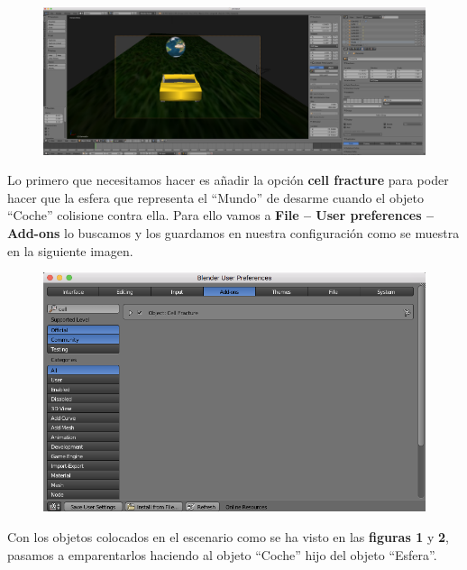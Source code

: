 \documentclass[10pt]{article}
\begin{document}
\begin{figure}[H]
	\begin{center}
	 		\includegraphics[width = 1.00\textwidth]{Imagenes/p5-img2}
	\end{center} 
\end{figure}

Lo primero que necesitamos hacer es añadir la opción \textbf{cell fracture} para poder hacer que la esfera que representa el ``Mundo'' de desarme cuando el objeto ``Coche'' colisione contra ella. Para ello vamos a \textbf{File -- User preferences -- Add-ons} lo buscamos y los guardamos en nuestra configuración como se muestra en la siguiente imagen. \\

\begin{figure}[H]
	\begin{center}
	 		\includegraphics[width = 1.00\textwidth]{Imagenes/p5-img3}
	\end{center} 
\end{figure}

Con los objetos colocados en el escenario como se ha visto en las \textbf{figuras 1} y \textbf{2}, pasamos a emparentarlos haciendo al objeto ``Coche'' hijo del objeto ``Esfera''. \\
\end{document}
